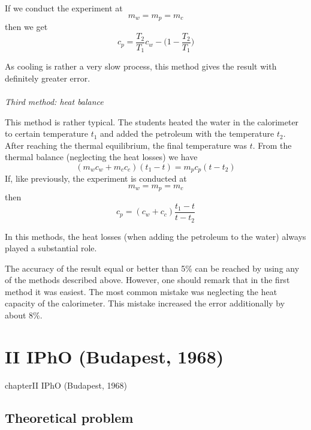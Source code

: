 \documentclass[12pt,a4paper]{book}
\begin{document}
	If we conduct the experiment at
	\begin{equation*}
		m_w=m_p=m_c
	\end{equation*}
	then we get
	\begin{equation}
		c_p=\frac{T_2}{T_1}c_w-\Big(1-\frac{T_2}{T_1}\Big)
	\end{equation}\par
	As cooling is rather a very slow process, this method gives the result with def\mbox{}initely greater error.\\ \\
	\noindent\emph{Third method: heat balance}\par
	This method is rather typical. The students heated the water in the calorimeter to certain temperature $t_1$ and added the petroleum with the temperature $t_2$. After reaching the thermal equilibrium, the final temperature was $t$. From the thermal balance (neglecting the heat losses) we have
	\begin{equation*}
		(m_wc_w+m_cc_c)(t_1-t)=m_pc_p(t-t_2)
	\end{equation*}
	If, like previously, the experiment is conducted at
	\begin{equation*}
		m_w=m_p=m_c
	\end{equation*}
	then
	\begin{equation}
		c_p=(c_w+c_c)\frac{t_1-t}{t-t_2}
	\end{equation}\par
	In this methods, the heat losses (when adding the petroleum to the water) always played a substantial role.\par
	The accuracy of the result equal or better than 5\% can be reached by using any of the methods described above. However, one should remark that in the f\mbox{}irst method it was easiest. The most common mistake was neglecting the heat capacity of the calorimeter. This mistake increased the error additionally by about 8\%.
\chapter*{II IPhO (Budapest, 1968)}
{chapter}{II IPhO (Budapest, 1968)}
\section*{Theoretical problem}
\end{document}
